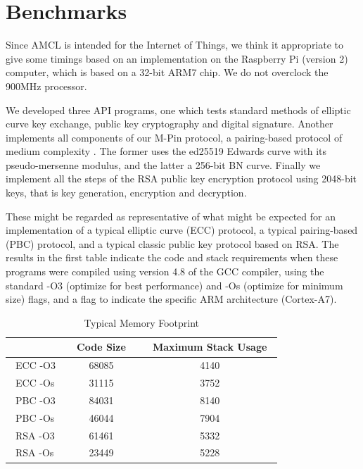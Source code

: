 \documentclass{llncs}
\begin{document}



\appendix

\section*{Benchmarks}

Since AMCL is intended for the Internet of Things, we think it appropriate to give some timings based on an implementation on the Raspberry Pi (version 2) computer, which is
based on a 32-bit ARM7 chip. We do not overclock the 900MHz processor. 

We developed three API programs, one which tests standard methods of elliptic curve key exchange, public key cryptography and digital signature. Another implements all components of our M-Pin protocol,
a pairing-based protocol of medium complexity \cite{mpin}.  The former uses the ed25519 Edwards curve \cite{bernstein-duif-lange-schwabe-yang} with its pseudo-mersenne modulus, and the latter a 256-bit BN curve.
Finally we implement all the steps of the RSA public key encryption protocol using 2048-bit keys, that is key generation, encryption and decryption.

These might be regarded as representative of what might be expected for an implementation of a typical elliptic curve (ECC) protocol, a typical pairing-based (PBC) protocol, and a typical classic 
public key protocol based on RSA.
The results in the first table indicate the code and stack requirements when these programs were compiled using version 4.8 of the GCC compiler, using the standard  -O3 (optimize for best performance) and -Os
(optimize for minimum size) flags, and a flag to indicate the specific ARM architecture (Cortex-A7).


\begin{table}
\centering
\begin{tabular}{|l|c|c|}
\hline
&~~Code Size~~&~Maximum Stack Usage~\\
\hline
~ECC  -O3 & 68085 & 4140  \\  %
~ECC  -Os & 31115 & 3752 \\   %
~PBC  -O3 & 84031 & 8140 \\   %
~PBC  -Os & 46044 & 7904 \\   %
~RSA  -O3 & 61461 & 5332 \\   %
~RSA  -Os & 23449 & 5228 \\   %
\hline
\end{tabular}
~\\
\caption{Typical Memory Footprint}
\label{footprint}
\end{table}
\end{document}
